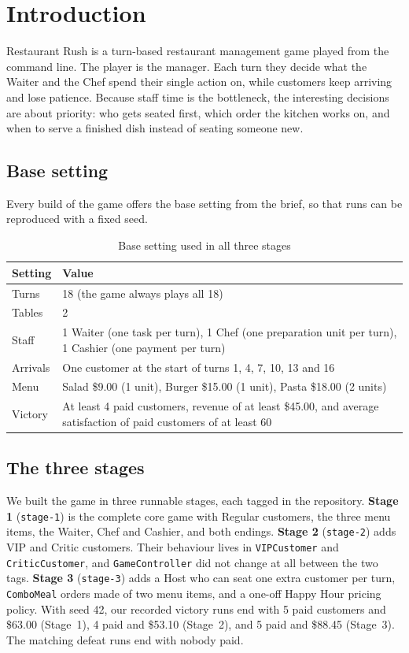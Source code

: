 \section{Introduction}
\label{sec:intro}

Restaurant Rush is a turn-based restaurant management game played from the command line. The player is the manager. Each turn they decide what the Waiter and the Chef spend their single action on, while customers keep arriving and lose patience. Because staff time is the bottleneck, the interesting decisions are about priority: who gets seated first, which order the kitchen works on, and when to serve a finished dish instead of seating someone new.

\subsection*{Base setting}

Every build of the game offers the base setting from the brief, so that runs can be reproduced with a fixed seed.

\begin{table}[H]
\centering
\caption{Base setting used in all three stages}
\label{tab:base-setting}
\begin{tabularx}{\textwidth}{@{}lX@{}}
\toprule
\textbf{Setting} & \textbf{Value} \\
\midrule
Turns & 18 (the game always plays all 18) \\
Tables & 2 \\
Staff & 1 Waiter (one task per turn), 1 Chef (one preparation unit per turn), 1 Cashier (one payment per turn) \\
Arrivals & One customer at the start of turns 1, 4, 7, 10, 13 and 16 \\
Menu & Salad \$9.00 (1 unit), Burger \$15.00 (1 unit), Pasta \$18.00 (2 units) \\
Victory & At least 4 paid customers, revenue of at least \$45.00, and average satisfaction of paid customers of at least 60 \\
\bottomrule
\end{tabularx}
\end{table}

\subsection*{The three stages}

We built the game in three runnable stages, each tagged in the repository.
\textbf{Stage 1} (\texttt{stage-1}) is the complete core game with Regular customers, the three menu items, the Waiter, Chef and Cashier, and both endings.
\textbf{Stage 2} (\texttt{stage-2}) adds VIP and Critic customers. Their behaviour lives in \texttt{VIPCustomer} and \texttt{CriticCustomer}, and \texttt{GameController} did not change at all between the two tags.
\textbf{Stage 3} (\texttt{stage-3}) adds a Host who can seat one extra customer per turn, \texttt{ComboMeal} orders made of two menu items, and a one-off Happy Hour pricing policy.
With seed 42, our recorded victory runs end with 5 paid customers and \$63.00 (Stage~1), 4 paid and \$53.10 (Stage~2), and 5 paid and \$88.45 (Stage~3). The matching defeat runs end with nobody paid.

